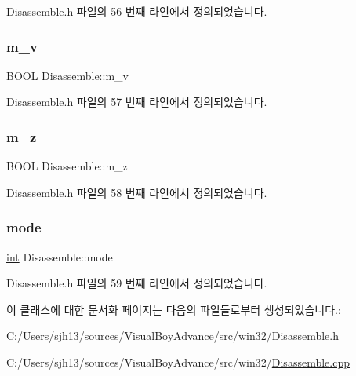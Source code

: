 Disassemble.\+h 파일의 56 번째 라인에서 정의되었습니다.

\mbox{\label{class_disassemble_ac8fad0495b1da26907516e83c876ec08}} 
\subsubsection{\texorpdfstring{m\+\_\+v}{m\_v}}
{\footnotesize\ttfamily B\+O\+OL Disassemble\+::m\+\_\+v}



Disassemble.\+h 파일의 57 번째 라인에서 정의되었습니다.

\mbox{\label{class_disassemble_ac4b4e68b91013731333b3019bbc16f1d}} 
\subsubsection{\texorpdfstring{m\+\_\+z}{m\_z}}
{\footnotesize\ttfamily B\+O\+OL Disassemble\+::m\+\_\+z}



Disassemble.\+h 파일의 58 번째 라인에서 정의되었습니다.

\mbox{\label{class_disassemble_a30b707e1da3b01abda044e78929404cc}} 
\subsubsection{\texorpdfstring{mode}{mode}}
{\footnotesize\ttfamily \mbox{\hyperlink{_util_8cpp_a0ef32aa8672df19503a49fab2d0c8071}{int}} Disassemble\+::mode}



Disassemble.\+h 파일의 59 번째 라인에서 정의되었습니다.



이 클래스에 대한 문서화 페이지는 다음의 파일들로부터 생성되었습니다.\+:\begin{DoxyCompactItemize}
\item 
C\+:/\+Users/sjh13/sources/\+Visual\+Boy\+Advance/src/win32/\mbox{\hyperlink{_disassemble_8h}{Disassemble.\+h}}\item 
C\+:/\+Users/sjh13/sources/\+Visual\+Boy\+Advance/src/win32/\mbox{\hyperlink{_disassemble_8cpp}{Disassemble.\+cpp}}\end{DoxyCompactItemize}
